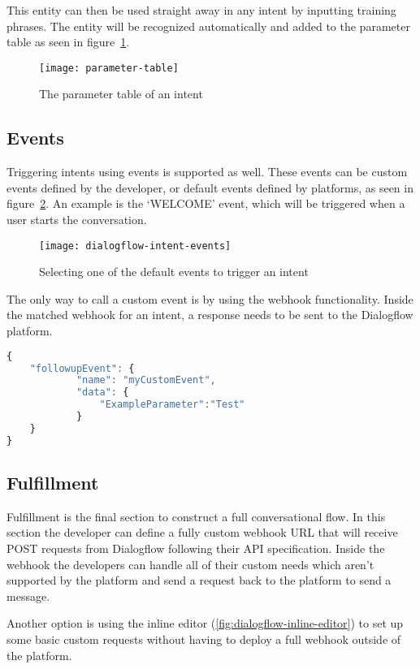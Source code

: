 This entity can then be used straight away in any intent by inputting training phrases. The entity will be recognized automatically and added to the parameter table as seen in figure~\ref{fig:parameter-table}.

\begin{figure}[ht]
	\centering
	\texttt{[image: parameter-table]}\label{fig:parameter-table}
	\caption{The parameter table of an intent}
\end{figure}

\subsection{Events}

Triggering intents using events is supported as well. These events can be custom events defined by the developer, or default events defined by platforms, as seen in figure~\ref{fig:dialogflow-intent-events}. An example is the `WELCOME' event, which will be triggered when a user starts the conversation.

\begin{figure}[ht]
	\centering
	\texttt{[image: dialogflow-intent-events]}\label{fig:dialogflow-intent-events}
	\caption{Selecting one of the default events to trigger an intent}
\end{figure}

The only way to call a custom event is by using the webhook functionality. Inside the matched webhook for an intent, a response needs to be sent to the Dialogflow platform.

\begin{lstlisting}[language=JavaScript,caption=The response that needs to be sent to the Dialogflow API to trigger a custom event,label=listing:webhook-send-event]
{
	"followupEvent": {
			"name": "myCustomEvent",
			"data": {
				"ExampleParameter":"Test"
			}
	}
}
\end{lstlisting}

\subsection{Fulfillment}

Fulfillment is the final section to construct a full conversational flow. In this section the developer can define a fully custom webhook URL that will receive POST requests from Dialogflow following their API specification. Inside the webhook the developers can handle all of their custom needs which aren't supported by the platform and send a request back to the platform to send a message.

Another option is using the inline editor (\ref{fig:dialogflow-inline-editor}) to set up some basic custom requests without having to deploy a full webhook outside of the platform.